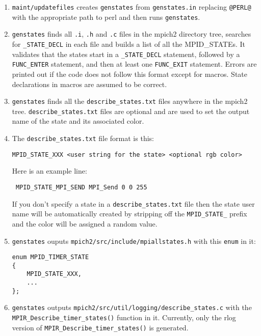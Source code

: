 \documentclass[dvipdfm,11pt]{article}
\begin{document}
\begin{enumerate}
\item \texttt{maint/updatefiles} creates \texttt{genstates} from 
\texttt{genstates.in} replacing \texttt{@PERL@} with the appropriate path to
perl and then runs \texttt{genstates}.

\item \texttt{genstates} finds all \texttt{.i}, \texttt{.h} and \texttt{.c} files 
in the mpich2 directory tree, searches for \texttt{\_STATE\_DECL} in each 
file and builds a list of all the MPID\_STATEs.  It validates that the states
start in a \texttt{\_STATE\_DECL} statement, followed by a \texttt{FUNC\_ENTER}
statement, and then at least one \texttt{FUNC\_EXIT} statement.  Errors are printed
out if the code does not follow this format except for macros.  State declarations
in macros are assumed to be correct.

\item \texttt{genstates} finds all the \texttt{describe\_states.txt} 
files anywhere in the mpich2 tree.  \texttt{describe\_states.txt} files are 
optional and are used to set the output name of the state and its associated 
color.

\item The \texttt{describe\_states.txt} file format is this:
\begin{verbatim}
MPID_STATE_XXX <user string for the state> <optional rgb color>
\end{verbatim}
 Here is an example line:
\begin{verbatim}
 MPID_STATE_MPI_SEND MPI_Send 0 0 255
\end{verbatim}
If you don't specify a state in a \texttt{describe\_states.txt} file then
the state user name will be automatically created by stripping off the 
\texttt{MPID\_STATE\_} prefix and the color will be assigned a random value.

\item \texttt{genstates} ouputs \texttt{mpich2/src/include/mpiallstates.h} 
with this \texttt{enum} in it:
\begin{verbatim}
enum MPID_TIMER_STATE
{
    MPID_STATE_XXX,
    ...
};
\end{verbatim}

\item \texttt{genstates} outputs 
\texttt{mpich2/src/util/logging/describe\_states.c} with the
\texttt{MPIR\_Describe\_timer\_states()} function in it.  Currently, only 
the rlog version of \texttt{MPIR\_Describe\_timer\_states()} is generated.

\end{enumerate}
\end{document}
